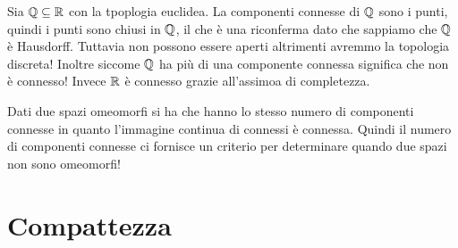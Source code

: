 \begin{example}
	Sia $\mathbb{Q}\subseteq\mathbb{R}$ con la tpoplogia euclidea. La componenti connesse di $\mathbb{Q}$ sono i punti, quindi i punti sono chiusi in $\mathbb{Q}$, il che è una riconferma dato che sappiamo che $\mathbb{Q}$ è Hausdorff. Tuttavia non possono essere aperti altrimenti avremmo la topologia discreta!\newline
	Inoltre siccome $\mathbb{Q}$ ha più di una componente connessa significa che non è connesso! Invece $\mathbb{R}$ è connesso grazie all'assimoa di completezza.
\end{example}

\begin{observe}
	Dati due spazi omeomorfi si ha che hanno lo stesso numero di componenti connesse in quanto l'immagine continua di connessi è connessa. Quindi il numero di componenti connesse ci fornisce un criterio per determinare quando due spazi non sono omeomorfi!
\end{observe}


		\section{Compattezza}